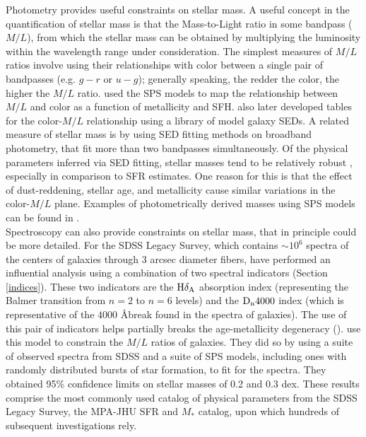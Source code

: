 Photometry provides useful constraints on stellar mass.  A useful
concept in the quantification of stellar mass is that the
Mass-to-Light ratio in some bandpass ($M/L$), from which the stellar
mass can be obtained by multiplying the luminosity within the
wavelength range under consideration.  The simplest measures of $M/L$
ratios involve using their relationships with color between a single
pair of bandpasses (e.g. $g-r$ or $u-g$); generally speaking, the
redder the color, the higher the $M/L$
ratio. \citet{2001ApJ...550..212B} used the
\citet{bruzual_stellar_2003} SPS models to map the relationship
between $M/L$ and color as a function of metallicity and
SFH. \citet{2009MNRAS.400.1181Z} also later developed tables for the
color-$M/L$ relationship using a library of model galaxy SEDs.  A
related measure of stellar mass is by using SED fitting methods on
broadband photometry, that fit more than two bandpasses
simultaneously. Of the physical parameters inferred via SED fitting,
stellar masses tend to be relatively robust
\citep{2001ApJ...559..620P, 2009ApJ...701.1839M}, especially in
comparison to SFR estimates. One reason for this is that the effect of
dust-reddening, stellar age, and metallicity cause similar variations
in the color-$M/L$ plane.  Examples of photometrically derived masses
using SPS models can be found in \citealt{2004ApJ...616L.103D,
  2007AJ....133..734B}.\\

Spectroscopy can also provide constraints on stellar mass, that in
principle could be more detailed. For the SDSS Legacy Survey, which
contains $\sim 10^6$ spectra of the centers of galaxies through 3
arcsec diameter fibers, \citet{kauffmann_stellar_2003} have performed
an influential analysis using a combination of two spectral indicators
(Section \ref{indices}). These two indicators are the ${\rm
  H}\delta_{\rm A}$ absorption index (representing the Balmer
transition from $n = 2$ to $n = 6$ levels) and the ${\rm D}_{\rm n}
4000$ index (which is representative of the $4000$ \AA break found in
the spectra of galaxies).  The use of this pair of indicators helps
partially breaks the age-metallicity degeneracy
(\citealt{worthey_comprehensive_1994}). \citet{kauffmann_stellar_2003}
use this model to constrain the $M/L$ ratios of galaxies. They did so
by using a suite of observed spectra from SDSS and a suite of SPS
models, including ones with randomly distributed bursts of star
formation, to fit for the spectra. They obtained 95\% confidence
limits on stellar masses of 0.2 and 0.3 dex.  These results comprise
the most commonly used catalog of physical parameters from the SDSS
Legacy Survey, the MPA-JHU SFR and $M_{*}$ catalog, upon which
hundreds of subsequent investigations rely.\\

